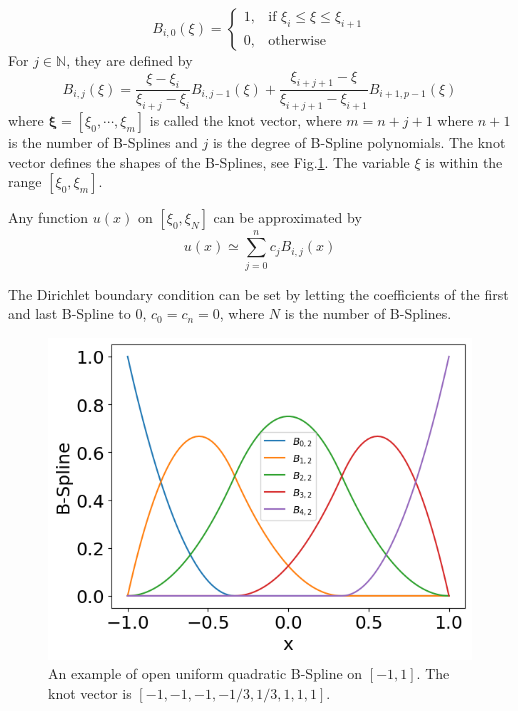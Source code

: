 \begin{equation}
	B_{i,0}(\xi) = \begin{cases}
		1, &\text{if } \xi_i\leq \xi \leq \xi_{i+1} \\
		0, &\text{otherwise}
	\end{cases}
\end{equation}
For $j\in\mathbb{N}$, they are defined by
\begin{equation}
	B_{i,j}(\xi) = \frac{\xi-\xi_i}{\xi_{i+j}-\xi_i}B_{i,j-1}(\xi) 
	+ \frac{\xi_{i+j+1}-\xi}{\xi_{i+j+1}-\xi_{i+1}}B_{i+1,p-1}(\xi) 
\end{equation}
where $\mathbf{\xi}=[\xi_0,\cdots,\xi_m]$ is called the knot vector, where $m=n+j+1$ where $n+1$ is the number of B-Splines and $j$ is the degree of B-Spline polynomials. The knot vector defines the shapes of the B-Splines, see Fig.\ref{fig:bspline}. The variable $\xi$ is within the range $[\xi_0, \xi_m]$. 

Any function $u(x)$ on $[\xi_0,\xi_N]$ can be approximated by
\[ u(x) \simeq \sum_{j=0}^{n} c_jB_{i,j}(x) \]

The Dirichlet boundary condition can be set by letting the coefficients of the first and last B-Spline to 0, $c_{0}=c_{n} = 0$, where $N$ is the number of B-Splines.


\begin{figure} [H]
	\centering
	\includegraphics[width=0.7\linewidth]{img/governing_equations/bspline}
	\caption{An example of open uniform quadratic B-Spline on $[-1,1]$. The knot vector is $[-1,-1,-1,-1/3,1/3,1,1,1]$.}
	\label{fig:bspline}
\end{figure}

